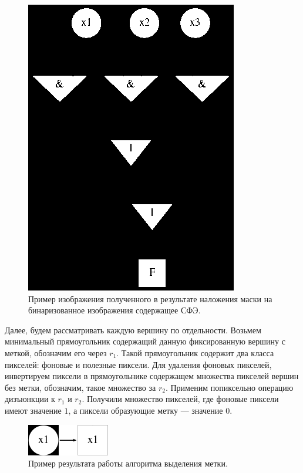 \documentclass[makeidx, a4paper, 14pt]{extarticle}
\begin{document}
\begin{figure}[H]
    \centering
    \includegraphics[scale=0.75]{img4_masked_vertices_labels.png}
    \caption{Пример изображения полученного в результате наложения маски на бинаризованное изображения содержащее СФЭ.}
\end{figure}

Далее, будем рассматривать каждую вершину по отдельности. Возьмем минимальный прямоугольник содержащий данную фиксированную вершину с меткой, обозначим
его через $r_1$. Такой прямоугольник содержит два класса пикселей: фоновые и полезные пиксели. Для удаления фоновых пикселей, инвертируем пиксели в
прямоугольнике содержащем множества пикселей вершин без метки, обозначим, такое множество за $r_2$. Применим попиксельно операцию дизъюнкции к $r_1$ и $r_2$. Получили множество пикселей, где фоновые пиксели имеют значение
$1$, а пиксели образующие метку --- значение $0$.

\begin{figure}[H]
    \centering
    \includegraphics[scale=4]{label_detection.png}
    \caption{Пример результата работы алгоритма выделения метки.}
\end{figure}
\end{document}
